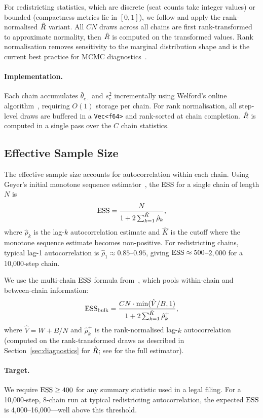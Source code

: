 For redistricting statistics, which are discrete (seat counts take
integer values) or bounded (compactness metrics lie in $[0,1]$),
we follow \citet{vehtari2021rank} and apply the rank-normalised $\hat{R}$
variant.
All $CN$ draws across all chains are first rank-transformed to
approximate normality, then $\hat{R}$ is computed on the transformed values.
Rank normalisation removes sensitivity to the marginal distribution shape
and is the current best practice for MCMC diagnostics~\citep{vehtari2021rank}.

\paragraph{Implementation.}
Each chain accumulates $\bar{\theta}_{c\cdot}$ and $s_c^2$ incrementally
using Welford's online algorithm~\citep{welford1962note}, requiring $O(1)$
storage per chain.
For rank normalisation, all step-level draws are buffered in a
\texttt{Vec<f64>} and rank-sorted at chain completion.
$\hat{R}$ is computed in a single pass over the $C$ chain statistics.

\subsection{Effective Sample Size}

The effective sample size accounts for autocorrelation within each chain.
Using Geyer's initial monotone sequence estimator~\citep{geyer1992practical},
the ESS for a single chain of length $N$ is
\[
  \mathrm{ESS} = \frac{N}{1 + 2\sum_{k=1}^{\hat{K}} \hat{\rho}_k},
\]
where $\hat{\rho}_k$ is the lag-$k$ autocorrelation estimate and
$\hat{K}$ is the cutoff where the monotone sequence estimate becomes
non-positive.
For redistricting chains, typical lag-1 autocorrelation is
$\hat{\rho}_1 \approx 0.85$--$0.95$, giving
$\mathrm{ESS} \approx 500$--$2{,}000$ for a 10{,}000-step chain.

We use the multi-chain $\mathrm{ESS}$ formula from~\citet{vehtari2021rank}, which
pools within-chain and between-chain information:
\[
  \mathrm{ESS}_{\text{bulk}} = \frac{CN \cdot \min(\hat{V}/B, 1)}{1 + 2\sum_{k=1}^{\hat{K}}\hat{\rho}_k^+},
\]
where $\hat{V} = W + B/N$ and $\hat{\rho}_k^+$ is the rank-normalised
lag-$k$ autocorrelation (computed on the rank-transformed draws as
described in Section~\ref{sec:diagnostics} for $\hat{R}$;
see \citealt{vehtari2021rank} for the full estimator).

\paragraph{Target.}
We require $\mathrm{ESS} \geq 400$ for any summary statistic used in a legal
filing.
For a 10{,}000-step, 8-chain run at typical redistricting autocorrelation,
the expected $\mathrm{ESS}$ is 4{,}000--16{,}000---well above this threshold.

